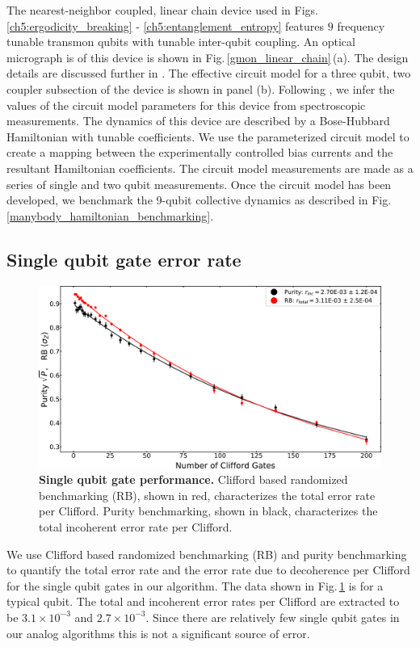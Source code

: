 The nearest-neighbor coupled, linear chain device used in Figs.\,\ref{ch5:ergodicity_breaking} - \ref{ch5:entanglement_entropy} features $9$ frequency tunable transmon qubits with tunable inter-qubit coupling.
An optical micrograph is of this device is shown in Fig.\,\ref{gmon_linear_chain}\,(a).
The design details are discussed further in \cite{Neill2018}.
The effective circuit model for a three qubit, two coupler subsection of the device is shown in panel (b).
Following \cite{Neill2018}, we infer the values of the circuit model parameters for this device from spectroscopic measurements.
The dynamics of this device are described by a Bose-Hubbard Hamiltonian with tunable coefficients.
We use the parameterized circuit model to create a mapping between the experimentally controlled bias currents and the resultant Hamiltonian coefficients.
The circuit model measurements are made as a series of single and two qubit measurements.
Once the circuit model has been developed, we benchmark the 9-qubit collective dynamics as described in Fig.\,\ref{manybody_hamiltonian_benchmarking}.

\subsection{Single qubit gate error rate}
\begin{figure}
\centering
\includegraphics[width=140mm, keepaspectratio]{./PDF/RB_supp_190530_1105a.pdf}
\caption{\textbf{Single qubit gate performance.}  Clifford based randomized benchmarking (RB), shown in red, characterizes the total error rate per Clifford.  Purity benchmarking, shown in black, characterizes the total incoherent error rate per Clifford.}
\label{sqrb}
\end{figure}
We use Clifford based randomized benchmarking (RB) and purity benchmarking to quantify the total error rate and the error rate due to decoherence per Clifford for the single qubit gates in our algorithm.
The data shown in Fig.\,\ref{sqrb} is for a typical qubit.  The total and incoherent error rates per Clifford are extracted to be $3.1 \times 10^{-3}$ and $2.7 \times 10^{-3}$.
Since there are relatively few single qubit gates in our analog algorithms this is not a significant source of error.

